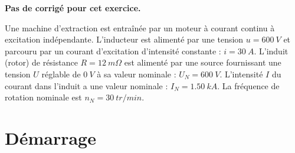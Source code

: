 \normaltrue \difficilefalse \tdifficilefalse
\correctionfalse

\setcounter{numques}{0}
\ifcorrection
\else
\textbf{Pas de corrigé pour cet exercice.}
\fi


Une machine d'extraction est entraînée par un moteur à courant continu à excitation
indépendante.
L'inducteur est alimenté par une tension $u = \SI{600}{V}$ et parcouru par un courant d'excitation
d'intensité constante : $i = \SI{30}{A}$.
L'induit (rotor) de résistance $R = \SI{12}{m \Omega}$ est alimenté par une source fournissant une tension $U$
réglable de $\SI{0}{V}$ à sa valeur nominale : $U_N = \SI{600}{V}$.
L'intensité $I$ du courant dans l'induit a une valeur nominale : $I_N = \SI{1,50}{kA}$.
La fréquence de rotation nominale est $n_N = \SI{30}{tr/min}$. 

\section*{Démarrage}


\ifprof
\begin{corrige}
\end{corrige}
\else
\fi

\ifprof
\begin{corrige}
\end{corrige}
\else
\fi
{}
\ifprof
\begin{corrige}
\end{corrige}
\else
\fi

\ifprof
\begin{corrige}
\end{corrige}
\else
\fi

